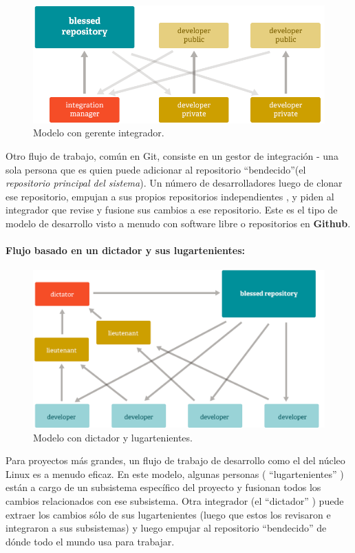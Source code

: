 \documentclass[12pt, spanish, oneside, onecolumn, a4paper]{report}
\begin{document}
\begin{figure}
  \begin{center}
  \includegraphics[width=.6\textwidth,keepaspectratio=true]{workflow-b.png}
  \end{center}
  \caption{Modelo con gerente integrador.}
\end{figure}
Otro flujo de trabajo, común en Git, consiste en un gestor de integración - una sola persona que es quien puede adicionar al repositorio ``bendecido''(el \emph{repositorio principal del sistema}). Un número de desarrolladores luego de clonar ese repositorio, empujan a sus propios repositorios independientes , y piden al integrador que revise y fusione sus cambios a ese repositorio. Este es el tipo de modelo de desarrollo visto a menudo con software libre o repositorios en \textbf{Github}.



\paragraph{Flujo basado en un dictador y sus lugartenientes:}



\begin{figure}
  \begin{center}
  \includegraphics[width=.6\textwidth,keepaspectratio=true]{workflow-c.png}
  \end{center}
  \caption{Modelo con dictador y lugartenientes.}
\end{figure}
Para proyectos más grandes, un flujo de trabajo de desarrollo como el del núcleo Linux es a menudo eficaz. En este modelo, algunas
personas ( ``lugartenientes'' ) están a cargo de un subsistema específico del proyecto y fusionan todos los cambios relacionados con ese subsistema. Otra integrador (el ``dictador'' ) puede extraer los cambios sólo de sus lugartenientes (luego que estos los revisaron e integraron a sus subsistemas) y luego empujar al repositorio ``bendecido'' de dónde todo el mundo usa para trabajar.
\end{document}
